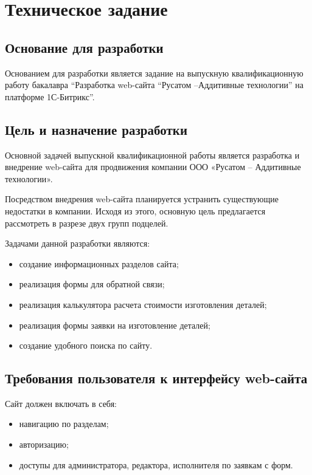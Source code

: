 \newsection
\section{Техническое задание}
\subsection{Основание для разработки}

Основанием для разработки является задание на выпускную квалификационную работу бакалавра ``Разработка web-сайта ``Русатом –Аддитивные технологии'' на платформе 1С-Битрикс''.

\subsection{Цель и назначение разработки}

Основной задачей выпускной квалификационной работы является разработка и внедрение web-сайта для продвижения компании ООО «Русатом – Аддитивные технологии».

Посредством внедрения web-сайта планируется устранить существующие недостатки в компании. Исходя из этого, основную цель предлагается рассмотреть в разрезе двух групп подцелей.

Задачами данной разработки являются:
\begin{itemize}
\item создание информационных разделов сайта;
\item    реализация формы для обратной связи;
\item реализация калькулятора расчета стоимости изготовления деталей;
\item реализация формы заявки на изготовление деталей;
\item создание удобного поиска по сайту.
\end{itemize}

\subsection{Требования пользователя к интерфейсу web-сайта}

Сайт должен включать в себя:
\begin{itemize}
    \item навигацию по разделам;
    \item авторизацию;
    \item доступы для администратора, редактора, исполнителя по заявкам с форм.
\end{itemize}

